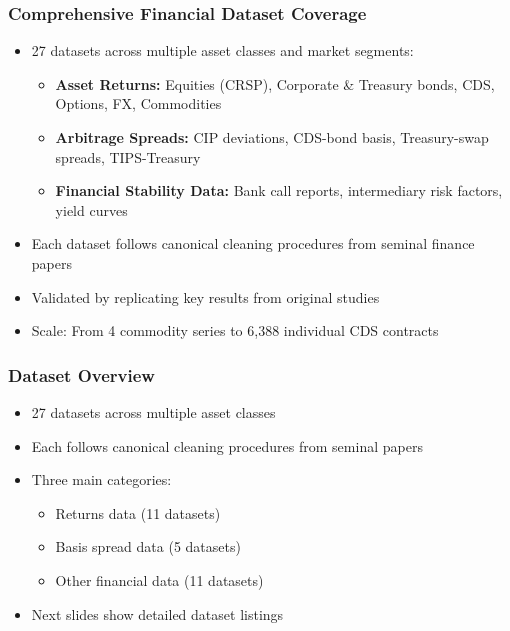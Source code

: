 \documentclass[ignorenonframetext, 9pt]{beamer}
\begin{document}
\begin{frame}
  \frametitle{Comprehensive Financial Dataset Coverage}
  \begin{itemize}
  \item \alert{27 datasets} across multiple asset classes and market segments:
  \vspace{0.1cm}
  \begin{itemize}
    \item \textbf{Asset Returns:} Equities (CRSP), Corporate \& Treasury bonds, CDS, Options, FX, Commodities
    \item \textbf{Arbitrage Spreads:} CIP deviations, CDS-bond basis, Treasury-swap spreads, TIPS-Treasury
    \item \textbf{Financial Stability Data:} Bank call reports, intermediary risk factors, yield curves
  \end{itemize}
  \vspace{0.2cm}
  \item Each dataset follows \alert{canonical cleaning procedures} from seminal finance papers
  \vspace{0.1cm}
  \item Validated by replicating key results from original studies
  \vspace{0.1cm}
  \item Scale: From 4 commodity series to 6,388 individual CDS contracts
  \end{itemize}
\label{slide:data_overview}
\end{frame}

\begin{frame}
  \frametitle{Dataset Overview}
  \begin{itemize}
  \item \alert{27 datasets} across multiple asset classes
  \item Each follows canonical cleaning procedures from seminal papers
  \item Three main categories:
  \begin{itemize}
    \item Returns data (11 datasets)
    \item Basis spread data (5 datasets)
    \item Other financial data (11 datasets)
  \end{itemize}
  \item Next slides show detailed dataset listings
  \end{itemize}
\end{frame}
\end{document}
